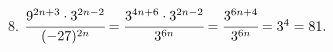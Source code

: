 8. $\cfrac{9^{2n+3}\cdot3^{2n-2}}{(-27)^{2n}}=\cfrac{3^{4n+6}\cdot3^{2n-2}}{3^{6n}}=\cfrac{3^{6n+4}}{3^{6n}}=3^4=81.$\\
